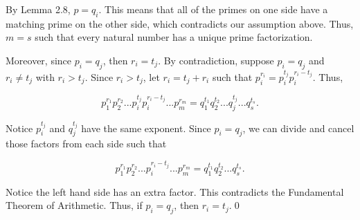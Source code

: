 \documentclass[12pt]{article}
\begin{document}
\noindent By Lemma 2.8, $p=q_{i}$. This means that all of the primes on one side have a matching prime on the other side, which contradicts our assumption above. Thus, $m=s$ such that every natural number has a unique prime factorization.

\bigskip

\noindent Moreover, since $p_{i}=q_{j}$, then $r_{i}=t_{j}$. By contradiction, suppose $p_{i}=q_{j}$ and $r_{i}\not=t_{j}$ with $r_{i}>t_{j}$. Since $r_{i}>t_{j}$, let $r_{i}=t_{j}+r_{i}$ such that $p_{i}^{r_{i}}=p_{i}^{t_{j}}p_{i}^{r_{i}-t_{j}}$. Thus,

\begin{equation*}
p_{1}^{r_{1}}p_{2}^{r_{2}}...p_{i}^{t_{j}}p_{i}^{r_{i}-t_{j}}...p_{m}^{r_{m}} = q_{1}^{t_{1}}q_{2}^{t_{2}}...q_{j}^{t_{j}}...q_{s}^{t_{s}}.
\end{equation*}

\noindent Notice $p_{i}^{t_{j}}$ and $q_{j}^{t_{j}}$ have the same exponent. Since $p_{i}=q_{j}$, we can divide and cancel those factors from each side such that

\begin{equation*}
p_{1}^{r_{1}}p_{2}^{r_{2}}...p_{i}^{r_{i}-t_{j}}...p_{m}^{r_{m}} = q_{1}^{t_{1}}q_{2}^{t_{2}}...q_{s}^{t_{s}}.
\end{equation*}

\noindent Notice the left hand side has an extra factor. This contradicts the Fundamental Theorem of Arithmetic. Thus, if $p_{i}=q_{j}$, then $r_{i}=t_{j}$.\qed
\end{document}
